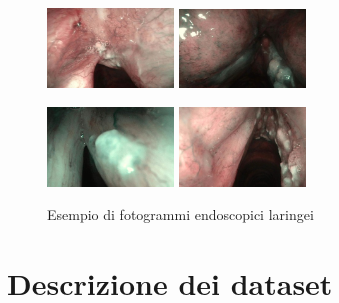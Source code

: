 \begin{figure}[ht]
    \centering
    \includegraphics[width=0.3\textwidth]{introduzione/Larynge-1.jpg}
    \includegraphics[width=0.3\textwidth]{introduzione/Larynge-2.jpg}

    \includegraphics[width=0.3\textwidth]
    {introduzione/Larynge-3.jpg}
    \includegraphics[width=0.3\textwidth]{introduzione/Larynge-4.jpg}
    \caption{Esempio di fotogrammi endoscopici laringei}
    \label{fig:larynges}
\end{figure}

\section{Descrizione dei dataset}\label{descrizione-dei-dataset}
